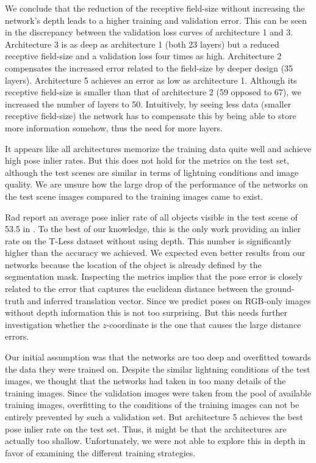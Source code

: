 We conclude that the reduction of the receptive field-size without increasing the network's depth leads to a higher training and validation error. This can be seen in the discrepancy between the validation loss curves of architecture 1 and 3. Architecture 3 is as deep as architecture 1 (both 23 layers) but a reduced receptive field-size and a validation loss four times as high. Architecture 2 compensates the increased error related to the field-size by deeper design (35 layers). Architecture 5 achieves an error as low as architecture 1. Although its receptive field-size is smaller than that of architecture 2 (59 opposed to 67), we increased the number of layers to 50. Intuitively, by seeing less data (smaller receptive field-size) the network has to compensate this by being able to store more information somehow, thus the need for more layers.

It appears like all architectures memorize the training data quite well and achieve high pose inlier rates. But this does not hold for the metrics on the test set, although the test scenes are similar in terms of lightning conditions and image quality. We are unsure how the large drop of the performance of the networks on the test scene images compared to the training images came to exist.

Rad \etal report an average pose inlier rate of all objects visible in the test scene of 53.5 in \cite{bb8}. To the best of our knowledge, this is the only work providing an inlier rate on the T-Less dataset without using depth. This number is significantly higher than the accuracy we achieved. We expected even better results from our networks because the location of the object is already defined by the segmentation mask. Inspecting the metrics implies that the pose error is closely related to the error that captures the euclidean distance between the ground-truth and inferred translation vector. Since we predict poses on RGB-only images without depth information this is not too surprising. But this needs further investigation whether the $z$-coordinate is the one that causes the large distance errors.

Our initial assumption was that the networks are too deep and overfitted towards the data they were trained on. Despite the similar lightning conditions of the test images, we thought that the networks had taken in too many details of the training images. Since the validation images were taken from the pool of available training images, overfitting to the conditions of the training images can not be entirely prevented by such a validation set. But architecture 5 achieves the best pose inlier rate on the test set. Thus, it might be that the architectures are actually too shallow. Unfortunately, we were not able to explore this in depth in favor of examining the different training strategies.

